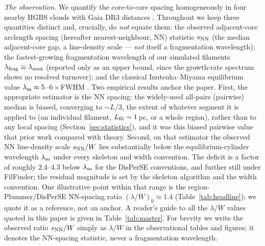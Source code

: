 \documentclass[usenatbib,twoside,twocolumn]{mnras}
\begin{document}
\emph{The observation.} We quantify the core-to-core spacing homogeneously in four nearby HGBS clouds with Gaia DR3 distances \citep{Zhang2023}. Throughout we keep three quantities distinct and, crucially, do \emph{not} equate them: the observed adjacent-core arclength spacing (hereafter nearest-neighbour, NN) statistic $s_{\rm NN}$ (the median adjacent-core gap, a line-density scale --- \emph{not} itself a fragmentation wavelength); the fastest-growing fragmentation wavelength of our simulated filaments $\lambda_{\rm frag}\equiv\lambda_{\rm max}$ (reported only as an upper bound, since the growth-rate spectrum shows no resolved turnover); and the classical Inutsuka--Miyama equilibrium value $\lambda_{\rm m}\approx5$--$6\times$FWHM \citep{Inutsuka1992,Fischera2012}. Two empirical results anchor the paper. First, the appropriate estimator is the NN spacing: the widely-used all-pairs (pairwise) median is biased, converging to $\sim L/3$, the extent of whatever segment it is applied to (an individual filament, $L_{\rm fil}\sim1$\,pc, or a whole region), rather than to any local spacing (Section~\ref{sec:statistics}), and it was this biased pairwise value that prior work compared with theory. Second, on that estimator the observed NN line-density scale $s_{\rm NN}/W$ lies substantially below the equilibrium-cylinder wavelength $\lambda_{\rm m}$ under every skeleton and width convention. The deficit is a factor of roughly $2.4$--$4.3$ below $\lambda_{\rm m}$ for the DisPerSE conventions, and further still under FilFinder; the residual magnitude is set by the skeleton algorithm and the width convention. One illustrative point within that range is the region-Plummer/DisPerSE NN-spacing ratio $(\lambda/W)_0\approx1.4$ (Table~\ref{tab:headline}); we quote it as a reference, not an anchor. A reader's guide to all the $\lambda/W$ values quoted in this paper is given in Table~\ref{tab:master}. For brevity we write the observed ratio $s_{\rm NN}/W$ simply as $\lambda/W$ in the observational tables and figures; it denotes the NN-spacing statistic, never a fragmentation wavelength.
\end{document}
